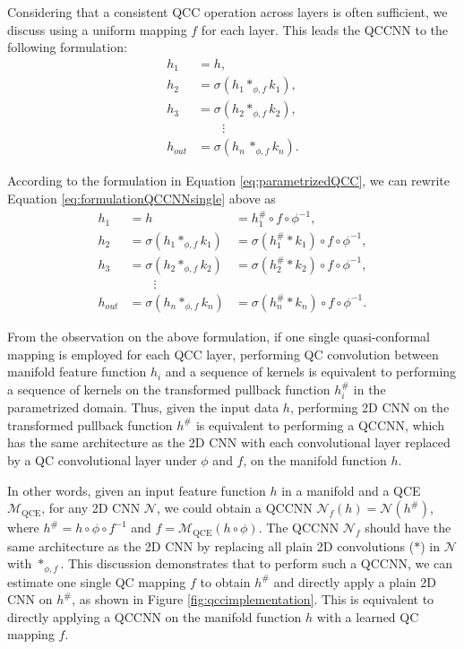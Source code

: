 Considering that a consistent QCC operation across layers is often sufficient, we discuss using a uniform mapping $ f $ for each layer. This leads the QCCNN to the following formulation:
\begin{equation}
\begin{aligned}
    h_1\, &= h, \\
    h_2\, &= \sigma(h_1 \ast_{\phi, f} k_1), \\
    h_3\, &= \sigma(h_2 \ast_{\phi, f} k_2), \\
    &\qquad \vdots\\    
    h_{out} &= \sigma(h_n \,\ast_{\phi, f} k_n).
\label{eq:formulationQCCNNsingle}
\end{aligned}
\end{equation}

According to the formulation in Equation \eqref{eq:parametrizedQCC}, we can rewrite Equation \eqref{eq:formulationQCCNNsingle} above as
\begin{equation}
\begin{array}{rll}
    h_1\, &= h &= h_1^\# \circ f \circ \phi^{-1}, \\
    h_2\, &= \sigma(h_1 \ast_{\phi, f} k_1) &= \sigma(h_1^\# \ast k_1) \circ f \circ \phi^{-1}, \\
    h_3\, &= \sigma(h_2 \ast_{\phi, f} k_2) &= \sigma(h_2^\# \ast k_2) \circ f \circ \phi^{-1}, \\
    &\qquad \vdots \\
    h_{out} &= \sigma(h_n \ast_{\phi, f} k_n) &= \sigma(h_n^\# \ast k_n) \circ f \circ \phi^{-1}.
\end{array}
\end{equation}

From the observation on the above formulation, if one single quasi-conformal mapping is employed for each QCC layer, performing QC convolution between manifold feature function $ h_i $ and a sequence of kernels is equivalent to performing a sequence of kernels on the transformed pullback function $ h_i^\# $ in the parametrized domain. Thus, given the input data $ h $, performing 2D CNN on the transformed pullback function $ h^\# $ is equivalent to performing a QCCNN, which has the same architecture as the 2D CNN with each convolutional layer replaced by a QC convolutional layer under $ \phi $ and $ f $, on the manifold function $ h $.

In other words, given an input feature function $ h $ in a manifold and a QCE $ \mathcal{M}_{\text{QCE}} $, for any 2D CNN $ \mathcal{N} $, we could obtain a QCCNN $ \mathcal{N}_{f}(h) = \mathcal{N}(h^\#) $, where $ h^\# = h \circ \phi \circ f^{-1} $ and $ f = \mathcal{M}_{\text{QCE}}(h \circ \phi) $. The QCCNN $ \mathcal{N}_f $ should have the same architecture as the 2D CNN by replacing all plain 2D convolutions ($ \ast $) in $ \mathcal{N} $ with $ \ast_{\phi, f} $. This discussion demonstrates that to perform such a QCCNN, we can estimate one single QC mapping $ f $ to obtain $ h^\# $ and directly apply a plain 2D CNN on $ h^\# $, as shown in Figure \ref{fig:qccimplementation}. This is equivalent to directly applying a QCCNN on the manifold function $ h $ with a learned QC mapping $ f $.

